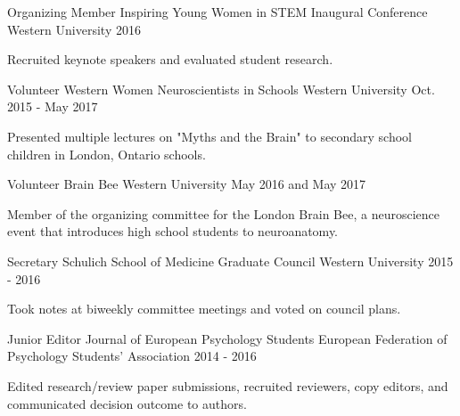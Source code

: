 \begin{cventries}
  \cventry
    {Organizing Member} %
    {Inspiring Young Women in STEM Inaugural Conference} 
    {Western University} %
    {2016} %
    {
      \begin{cvitems} %
        \item {Recruited keynote speakers and evaluated student research.}
      \end{cvitems}
    }
    
  \cventry
  	{Volunteer} %
    {Western Women Neuroscientists in Schools}
    {Western University}
    {Oct. 2015 - May 2017} %
    {
      \begin{cvitems} %
        \item {Presented multiple lectures on "Myths and the Brain" to secondary school children in London, Ontario schools.}
      \end{cvitems}
    }
    
  \cventry
  	{Volunteer} %
    {Brain Bee}
    {Western University}
    {May 2016 and May 2017} %
    {
      \begin{cvitems} %
        \item {Member of the organizing committee for the London Brain Bee, a neuroscience event that introduces high school students to neuroanatomy.}
      \end{cvitems}
    }
    
  \cventry
    {Secretary} %
    {Schulich School of Medicine Graduate Council} %
    {Western University} %
    {2015 - 2016} %
    {
      \begin{cvitems} %
        \item {Took notes at biweekly committee meetings and voted on council plans.}
      \end{cvitems}
    }
    
  \cventry
    {Junior Editor} %
    {Journal of European Psychology Students} %
    {European Federation of Psychology Students' Association}
    {2014 - 2016} %
    {
      \begin{cvitems} %
        \item {Edited research/review paper submissions, recruited reviewers, copy editors, and communicated decision outcome to authors.}
      \end{cvitems}
    }
    

\end{cventries}
